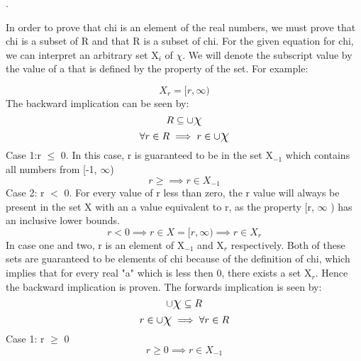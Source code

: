 \documentclass[11pt]{article}
\begin{document}
\begin{enumerate}
.

In order to prove that chi is an element of the real numbers, we must prove that chi is a subset of R and that R is a subset of chi. For the given equation for chi, we can interpret an arbitrary set X$_{i}$ of \mbox{\Large$\chi$}. We will denote the subscript value by the value of a that is defined by the property of the set. For example: 

\begin{equation}
        X_{r} = [r, \infty) 
\end{equation}
\newline The backward implication can be seen by: 
\begin{equation}
    R \subseteq \cup \mbox{\Large$\chi$}
\end{equation}
\begin{equation}
    \forall r \in R  \implies r \in \cup \mbox{\Large$\chi$} 
\end{equation}
Case 1:r $\leq$ 0. In this case, r is guaranteed to be in the set X$_{-1}$ which contains all numbers from [-1, $\infty$) 
\begin{equation}
    r \geq \implies r \in X_{-1} 
\end{equation}
\newline
Case 2: 
 r $<$ 0. For every value of r less than zero, the r value will always be present in the set X  with an a value equivalent to r, as the property [r, $\infty$ ) has an inclusive lower bounds.
\begin{equation}
    r < 0 \implies r \in X= [r, \infty) \implies r \in X_{r}
\end{equation}
In case one and two, r is an element of X$_{-1}$ and X$_{r}$ respectively. Both of these sets are guaranteed to be elements of chi because of the definition of chi, which implies that for every real "a" which is less then 0, there exists a set X$_{r}$. Hence the backward implication is proven.
\newline \newline
The forwards implication is seen by: 
\begin{equation}
    \cup \mbox{\Large$\chi$} \subseteq R
\end{equation}
\begin{equation}
      r \in \cup \mbox{\Large$\chi$} \implies  \forall r \in R
\end{equation}
Case 1: r $\geq$ 0
\begin{equation}
    r \geq 0 \implies r \in  X_{-1} 
\end{equation}

\end{enumerate}
\end{document}
